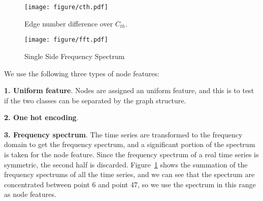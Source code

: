 \documentclass{article}
\begin{document}
\begin{figure}
\centering
\begin{minipage}{.5\textwidth}
  \centering
    \texttt{[image: figure/cth.pdf]}
    \caption{Edge number difference over $C_{th}$.}
    \label{fig:cth}
\end{minipage}%
\begin{minipage}{.5\textwidth}
  \centering
    \texttt{[image: figure/fft.pdf]}
    \caption{Single Side Frequency Spectrum}
    \label{fig:fft}
\end{minipage}
\end{figure}

We use the following three types of node features:

\textbf{1. Uniform feature}. Nodes are assigned an uniform feature, and this is to test if the two classes can be separated by the graph structure.

\textbf{2. One hot encoding}.

\textbf{3. Frequency spectrum}. The time series are transformed to the frequency domain to get the frequency spectrum, and a significant portion of the spectrum is taken for the node feature. Since the frequency spectrum of a real time series is symmetric, the second half is discarded. Figure~\ref{fig:fft} shows the summation of the frequency spectrums of all the time series, and we can see that the spectrum are concentrated between point 6 and point 47, so we use the spectrum in this range as node features.
\end{document}
